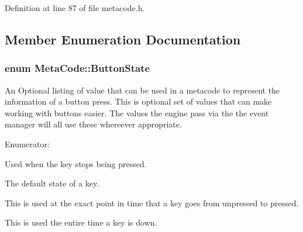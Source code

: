 Definition at line 87 of file metacode.h.

\subsection{Member Enumeration Documentation}
\hypertarget{classMetaCode_a8bcce67af20f4f779ba6f5387e438077}{
\subsubsection[{ButtonState}]{\setlength{\rightskip}{0pt plus 5cm}enum {\bf MetaCode::ButtonState}}}
\label{d7/d72/classMetaCode_a8bcce67af20f4f779ba6f5387e438077}


An Optional listing of value that can be used in a metacode to represent the information of a button press. This is optional set of values that can make working with buttons easier. The values the engine pass via the the event manager will all use these whereever appropriate. \begin{Desc}
\item[Enumerator: ]\par
\begin{description}
\item[{\em 
\hypertarget{classMetaCode_a8bcce67af20f4f779ba6f5387e438077aa16bc921174974d9e30752eff7af8336}{
BUTTON\_\-LIFTING}
\label{d7/d72/classMetaCode_a8bcce67af20f4f779ba6f5387e438077aa16bc921174974d9e30752eff7af8336}
}]Used when the key stops being pressed. \item[{\em 
\hypertarget{classMetaCode_a8bcce67af20f4f779ba6f5387e438077a87e2c9bdb3c969158f85543759dce244}{
BUTTON\_\-UP}
\label{d7/d72/classMetaCode_a8bcce67af20f4f779ba6f5387e438077a87e2c9bdb3c969158f85543759dce244}
}]The default state of a key. \item[{\em 
\hypertarget{classMetaCode_a8bcce67af20f4f779ba6f5387e438077a1113791ce46932b93099ba765116b0d7}{
BUTTON\_\-PRESSING}
\label{d7/d72/classMetaCode_a8bcce67af20f4f779ba6f5387e438077a1113791ce46932b93099ba765116b0d7}
}]This is used at the exact point in time that a key goes from unpressed to pressed. \item[{\em 
\hypertarget{classMetaCode_a8bcce67af20f4f779ba6f5387e438077a73ef49474af25ad4c503fe27420c6448}{
BUTTON\_\-DOWN}
\label{d7/d72/classMetaCode_a8bcce67af20f4f779ba6f5387e438077a73ef49474af25ad4c503fe27420c6448}
}]This is used the entire time a key is down. \end{description}
\end{Desc}



